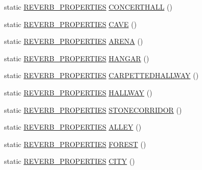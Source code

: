 \begin{DoxyCompactItemize}
\item 
static \hyperlink{struct_f_m_o_d_1_1_r_e_v_e_r_b___p_r_o_p_e_r_t_i_e_s}{R\+E\+V\+E\+R\+B\+\_\+\+P\+R\+O\+P\+E\+R\+T\+I\+ES} \hyperlink{class_f_m_o_d_1_1_p_r_e_s_e_t_ae86e3115b83079fd27aa7301954d9d3a}{C\+O\+N\+C\+E\+R\+T\+H\+A\+LL} ()
\item 
static \hyperlink{struct_f_m_o_d_1_1_r_e_v_e_r_b___p_r_o_p_e_r_t_i_e_s}{R\+E\+V\+E\+R\+B\+\_\+\+P\+R\+O\+P\+E\+R\+T\+I\+ES} \hyperlink{class_f_m_o_d_1_1_p_r_e_s_e_t_a4b0a7dac93f9f5eecf5b90e250c08cf7}{C\+A\+VE} ()
\item 
static \hyperlink{struct_f_m_o_d_1_1_r_e_v_e_r_b___p_r_o_p_e_r_t_i_e_s}{R\+E\+V\+E\+R\+B\+\_\+\+P\+R\+O\+P\+E\+R\+T\+I\+ES} \hyperlink{class_f_m_o_d_1_1_p_r_e_s_e_t_acde80a8345c707c7f3df71670c06716d}{A\+R\+E\+NA} ()
\item 
static \hyperlink{struct_f_m_o_d_1_1_r_e_v_e_r_b___p_r_o_p_e_r_t_i_e_s}{R\+E\+V\+E\+R\+B\+\_\+\+P\+R\+O\+P\+E\+R\+T\+I\+ES} \hyperlink{class_f_m_o_d_1_1_p_r_e_s_e_t_a06ff25958ac447b28c9b2bd1d2b968af}{H\+A\+N\+G\+AR} ()
\item 
static \hyperlink{struct_f_m_o_d_1_1_r_e_v_e_r_b___p_r_o_p_e_r_t_i_e_s}{R\+E\+V\+E\+R\+B\+\_\+\+P\+R\+O\+P\+E\+R\+T\+I\+ES} \hyperlink{class_f_m_o_d_1_1_p_r_e_s_e_t_ab00bc9d1e75236bc4cfe6b8a7f1955c6}{C\+A\+R\+P\+E\+T\+T\+E\+D\+H\+A\+L\+L\+W\+AY} ()
\item 
static \hyperlink{struct_f_m_o_d_1_1_r_e_v_e_r_b___p_r_o_p_e_r_t_i_e_s}{R\+E\+V\+E\+R\+B\+\_\+\+P\+R\+O\+P\+E\+R\+T\+I\+ES} \hyperlink{class_f_m_o_d_1_1_p_r_e_s_e_t_ab03f3b2f75d45ca67a1904d2ed051264}{H\+A\+L\+L\+W\+AY} ()
\item 
static \hyperlink{struct_f_m_o_d_1_1_r_e_v_e_r_b___p_r_o_p_e_r_t_i_e_s}{R\+E\+V\+E\+R\+B\+\_\+\+P\+R\+O\+P\+E\+R\+T\+I\+ES} \hyperlink{class_f_m_o_d_1_1_p_r_e_s_e_t_a3b8d220ad2fb00869e90177bca64fc6c}{S\+T\+O\+N\+E\+C\+O\+R\+R\+I\+D\+OR} ()
\item 
static \hyperlink{struct_f_m_o_d_1_1_r_e_v_e_r_b___p_r_o_p_e_r_t_i_e_s}{R\+E\+V\+E\+R\+B\+\_\+\+P\+R\+O\+P\+E\+R\+T\+I\+ES} \hyperlink{class_f_m_o_d_1_1_p_r_e_s_e_t_a4da51f2600a1c038a04647325c7713a1}{A\+L\+L\+EY} ()
\item 
static \hyperlink{struct_f_m_o_d_1_1_r_e_v_e_r_b___p_r_o_p_e_r_t_i_e_s}{R\+E\+V\+E\+R\+B\+\_\+\+P\+R\+O\+P\+E\+R\+T\+I\+ES} \hyperlink{class_f_m_o_d_1_1_p_r_e_s_e_t_ae2e55de2f958ba39e853d5f00cf5adab}{F\+O\+R\+E\+ST} ()
\item 
static \hyperlink{struct_f_m_o_d_1_1_r_e_v_e_r_b___p_r_o_p_e_r_t_i_e_s}{R\+E\+V\+E\+R\+B\+\_\+\+P\+R\+O\+P\+E\+R\+T\+I\+ES} \hyperlink{class_f_m_o_d_1_1_p_r_e_s_e_t_a148217b955b41ce4853a96cdfbfff1b9}{C\+I\+TY} ()

\end{DoxyCompactItemize}
